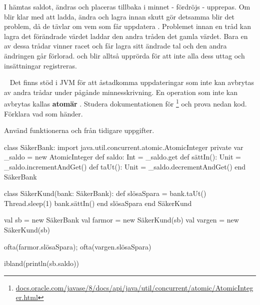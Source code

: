 \SOLUTION


\TaskSolved \what

\SubtaskSolved  I  hämtas saldot, ändras och placeras tillbaka i minnet -  fördröjs -  upprepas. Om  blir klar med att ladda, ändra och lagra innan skutt gör detsamma blir det problem, då de tävlar om vem som får uppdatera . Problemet innan en tråd kan lagra det förändrade värdet laddar den andra tråden det gamla värdet. Bara en av dessa trådar vinner racet och får lagra sitt ändrade tal och den andra ändringen går förlorad.  och  blir alltså upprörda för att inte alla dess uttag och insättningar registreras.


\QUESTEND







\QUESTBEGIN

\Task  \what~  Det finns stöd i JVM för att åstadkomma uppdateringar som inte kan avbrytas av andra trådar under pågånde minnesskrivning. En operation som inte kan avbrytas kallas \textbf{atomär} . Studera dokumentationen för \footnote{\href{https://docs.oracle.com/javase/8/docs/api/java/util/concurrent/atomic/AtomicInteger.html}{docs.oracle.com/javase/8/docs/api/java/util/concurrent/atomic/AtomicInteger.html}} och prova nedan kod. Förklara vad som händer.

Använd funktionerna  och  från tidigare uppgifter.
\begin{Code}
class SäkerBank:
  import java.util.concurrent.atomic.AtomicInteger
  private var _saldo = new AtomicInteger
  def saldo: Int = _saldo.get
  def sättIn(): Unit = _saldo.incrementAndGet()
  def taUt(): Unit   = _saldo.decrementAndGet()
end SäkerBank

class SäkerKund(bank: SäkerBank):
  def slösaSpara = 
    bank.taUt()
    Thread.sleep(1)
    bank.sättIn()
  end slösaSpara
end SäkerKund

\end{Code}
\begin{REPL}
val sb = new SäkerBank
val farmor = new SäkerKund(sb)
val vargen = new SäkerKund(sb)

ofta(farmor.slösaSpara); ofta(vargen.slösaSpara)

ibland(println(sb.saldo))
\end{REPL}


